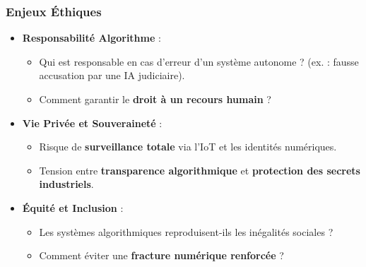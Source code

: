 \documentclass[a4paper,12pt]{report}
\begin{document}
	\subsubsection{Enjeux Éthiques}
	\begin{itemize}
		\item \textbf{Responsabilité Algorithme} :
		\begin{itemize}
			\item Qui est responsable en cas d’erreur d’un système autonome ? (ex. : fausse accusation par une IA judiciaire).
			\item Comment garantir le \textbf{droit à un recours humain} ?
		\end{itemize}
		\item \textbf{Vie Privée et Souveraineté} :
		\begin{itemize}
			\item Risque de \textbf{surveillance totale} via l’IoT et les identités numériques.
			\item Tension entre \textbf{transparence algorithmique} et \textbf{protection des secrets industriels}.
		\end{itemize}
		\item \textbf{Équité et Inclusion} :
		\begin{itemize}
			\item Les systèmes algorithmiques reproduisent-ils les inégalités sociales ?
			\item Comment éviter une \textbf{fracture numérique renforcée} ?
		\end{itemize}
	\end{itemize}
	
\end{document}
